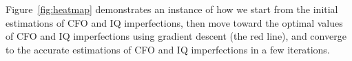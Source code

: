 Figure~\ref{fig:heatmap} demonstrates an instance of how we start from the initial estimations of CFO and IQ imperfections, then move toward the optimal values of CFO and IQ imperfections using gradient descent (the red line), and converge to the accurate estimations of CFO and IQ imperfections in a few iterations.


